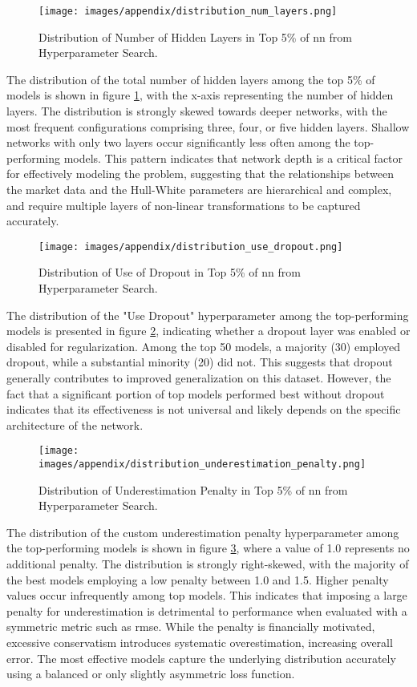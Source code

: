 \begin{figure}[H]
	\centering
	\texttt{[image: images/appendix/distribution\_num\_layers.png]}
	\caption{Distribution of Number of Hidden Layers in Top 5\% of \ac{nn} from Hyperparameter Search.}
	\label{fig:distribution_num_layers}
\end{figure}
The distribution of the total number of hidden layers among the top 5\% of models is shown in figure \ref{fig:distribution_num_layers}, with the x-axis representing the number of hidden layers. The distribution is strongly skewed towards deeper networks, with the most frequent configurations comprising three, four, or five hidden layers. Shallow networks with only two layers occur significantly less often among the top-performing models. This pattern indicates that network depth is a critical factor for effectively modeling the problem, suggesting that the relationships between the market data and the Hull-White parameters are hierarchical and complex, and require multiple layers of non-linear transformations to be captured accurately.

\begin{figure}[H]
	\centering
	\texttt{[image: images/appendix/distribution\_use\_dropout.png]}
	\caption{Distribution of Use of Dropout in Top 5\% of \ac{nn} from Hyperparameter Search.}
	\label{fig:distribution_use_dropout}
\end{figure}
The distribution of the "Use Dropout" hyperparameter among the top-performing models is presented in figure \ref{fig:distribution_use_dropout}, indicating whether a dropout layer was enabled or disabled for regularization. Among the top 50 models, a majority (30) employed dropout, while a substantial minority (20) did not. This suggests that dropout generally contributes to improved generalization on this dataset. However, the fact that a significant portion of top models performed best without dropout indicates that its effectiveness is not universal and likely depends on the specific architecture of the network.

\begin{figure}[H]
	\centering
	\texttt{[image: images/appendix/distribution\_underestimation\_penalty.png]}
	\caption{Distribution of Underestimation Penalty in Top 5\% of \ac{nn} from Hyperparameter Search.}
	\label{fig:distribution_underestimation_penalty}
\end{figure}
The distribution of the custom underestimation penalty hyperparameter among the top-performing models is shown in figure \ref{fig:distribution_underestimation_penalty}, where a value of 1.0 represents no additional penalty. The distribution is strongly right-skewed, with the majority of the best models employing a low penalty between 1.0 and 1.5. Higher penalty values occur infrequently among top models. This indicates that imposing a large penalty for underestimation is detrimental to performance when evaluated with a symmetric metric such as \ac{rmse}. While the penalty is financially motivated, excessive conservatism introduces systematic overestimation, increasing overall error. The most effective models capture the underlying distribution accurately using a balanced or only slightly asymmetric loss function.

